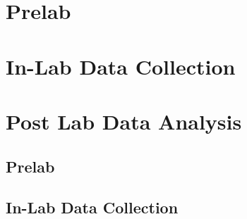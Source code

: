 \documentclass[12pt]{article}
\begin{document}

\begin{fullreport}
    
    \section{Prelab}
    
    \clearpage
    \section{In-Lab Data Collection}
    
    \clearpage
    \section{Post Lab Data Analysis}
    
\end{fullreport}

\begin{prelab}
    \section{Prelab}
    
\end{prelab}

\begin{data}
    \section{In-Lab Data Collection}
    
\end{data}
\end{document}
